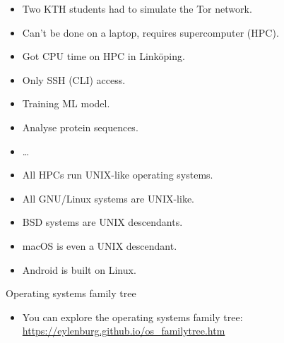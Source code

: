 \begin{frame}
  \begin{example}[Supercomputing]
    \begin{itemize}
      \item Two KTH students had to simulate the Tor network.
      \item Can't be done on a laptop, requires supercomputer (HPC).
      \item Got CPU time on HPC in Linköping.
      \item Only SSH (CLI) access.
    \end{itemize}
  \end{example}

  \pause

  \begin{example}
    \begin{itemize}
      \item Training ML model.
      \item Analyse protein sequences.
      \item \dots
    \end{itemize}
  \end{example}
\end{frame}

\begin{frame}
  \begin{remark}
    \begin{itemize}
      \item All HPCs run UNIX-like operating systems.
      \item All GNU/Linux systems are UNIX-like.
      \item BSD systems are UNIX descendants.
      \item macOS is even a UNIX descendant.
      \item Android is built on Linux.
    \end{itemize}
  \end{remark}

  \pause

  \begin{block}{Operating systems family tree}
    \begin{itemize}
      \item You can explore the operating systems family tree:
        \url{https://eylenburg.github.io/os_familytree.htm}
    \end{itemize}
  \end{block}
\end{frame}
